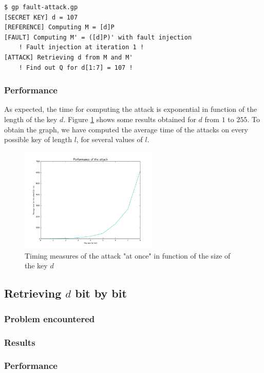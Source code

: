 \documentclass[journal]{IEEEtran}
\begin{document}
\begin{footnotesize}
\begin{verbatim}
$ gp fault-attack.gp 
[SECRET KEY] d = 107
[REFERENCE] Computing M = [d]P
[FAULT] Computing M' = ([d]P)' with fault injection
    ! Fault injection at iteration 1 !
[ATTACK] Retrieving d from M and M'
    ! Find out Q for d[1:7] = 107 !
\end{verbatim}
\end{footnotesize}

\subsubsection{Performance}
\label{perf-all}
As expected, the time for computing the attack is exponential in function of the length of the key $d$. Figure \ref{first-attack-perf} shows some results obtained for $d$ from $1$ to $255$. 
To obtain the graph, we have computed the average time of the attacks on every possible key of length $l$, for several values of $l$.

\begin{figure}
    \centering
    \includegraphics[width=250px]{img/first-attack-perf.png}
    \caption{Timing measures of the attack "at once" in function of the size of the key $d$}
    \label{first-attack-perf}
\end{figure}   


\subsection{Retrieving $d$ bit by bit}

\subsubsection{Problem encountered}

\subsubsection{Results}
\subsubsection{Performance}
\end{document}
